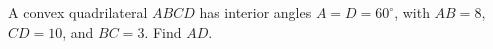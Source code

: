 A convex quadrilateral $ABCD$ has interior angles $A=D=60^\circ$, with $AB=8$, $CD=10$, and $BC=3$. Find $AD$.
